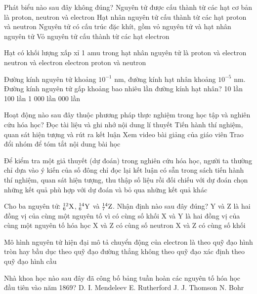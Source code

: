 \documentclass[11pt,a4paper]{article}
\begin{document}
\begin{ex}
Phát biểu nào sau đây không đúng?
\choice
{Nguyên tử được cấu thành từ các hạt cơ bản là proton, neutron và electron}
{Hạt nhân nguyên tử cấu thành từ các hạt proton và neutron}
{\True Nguyên tử có cấu trúc đặc khít, gồm vỏ nguyên tử và hạt nhân nguyên tử}
{Vỏ nguyên tử cấu thành từ các hạt electron}
\end{ex}
\begin{ex}
Hạt có khối lượng xấp xỉ 1 amu trong hạt nhân nguyên tử là
\choice
{proton và electron}
{neutron và electron}
{electron}
{\True proton và neutron}
\end{ex}
\begin{ex}
Đường kính nguyên tử khoảng $10^{-1}\text{ nm}$, đường kính hạt nhân khoảng $10^{-5}\text{ nm}$. Đường kính nguyên tử gấp khoảng bao nhiêu lần đường kính hạt nhân?
\choice
{10 lần}
{100 lần}
{1 000 lần}
{ 000 lần}
\end{ex}
\begin{ex}
Hoạt động nào sau đây thuộc phương pháp thực nghiệm trong học tập và nghiên cứu hóa học?
\choice
{Đọc tài liệu và ghi nhớ nội dung lí thuyết}
{\True Tiến hành thí nghiệm, quan sát hiện tượng và rút ra kết luận}
{Xem video bài giảng của giáo viên}
{Trao đổi nhóm để tóm tắt nội dung bài học}
\end{ex}
\begin{ex}
Để kiểm tra một giả thuyết (dự đoán) trong nghiên cứu hóa học, người ta thường
\choice
{chỉ dựa vào ý kiến của số đông}
{chỉ đọc lại kết luận có sẵn trong sách}
{\True tiến hành thí nghiệm, quan sát hiện tượng, thu thập số liệu rồi đối chiếu với dự đoán}
{chọn những kết quả phù hợp với dự đoán và bỏ qua những kết quả khác}
\end{ex}
\begin{ex}
Cho ba nguyên tử: $^{12}_6\ce{X}$, $^{14}_6\ce{Y}$ và $^{14}_7\ce{Z}$. Nhận định nào sau đây đúng?
\choice
{Y và Z là hai đồng vị của cùng một nguyên tố vì có cùng số khối}
{\True X và Y là hai đồng vị của cùng một nguyên tố hóa học}
{X và Z có cùng số neutron}
{X và Z có cùng số khối}
\end{ex}
\begin{ex}
Mô hình nguyên tử hiện đại mô tả chuyển động của electron là
\choice
{theo quỹ đạo hình tròn hay bầu dục}
{theo quỹ đạo đường thẳng}
{\True không theo quỹ đạo xác định}
{theo quỹ đạo hình cầu}
\end{ex}
\begin{ex}
Nhà khoa học nào sau đây đã công bố bảng tuần hoàn các nguyên tố hóa học đầu tiên vào năm 1869?
\choice
{\True D. I. Mendeleev}
{E. Rutherford}
{J. J. Thomson}
{N. Bohr}
\end{ex}
\end{document}
